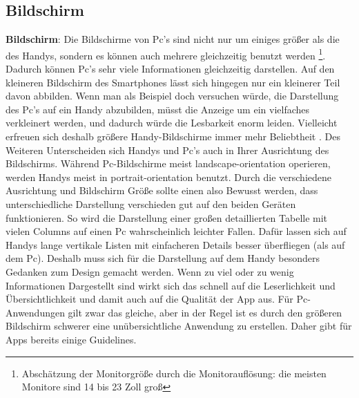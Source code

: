 \subsection{Bildschirm}

\myNewSection
\textbf{Bildschirm}: Die Bildschirme von Pc's sind nicht nur um einiges größer als die des Handys, sondern es können auch mehrere gleichzeitig benutzt werden \cite{pcVsphone_screenResolutionStats}\cite{pcVsphone_screenResolutionToSize}\footnote{Abschätzung der Monitorgröße durch die Monitorauflösung: die meisten Monitore sind 14 bis 23 Zoll groß}.\newline%
Dadurch können Pc's sehr viele Informationen gleichzeitig darstellen. Auf den kleineren Bildschirm des Smartphones lässt sich hingegen nur ein kleinerer Teil davon abbilden. Wenn man als Beispiel doch versuchen würde, die Darstellung des Pc's auf ein Handy abzubilden, müsst die Anzeige um ein vielfaches verkleinert werden, und dadurch würde die Lesbarkeit enorm leiden. Vielleicht erfreuen sich deshalb größere Handy-Bildschirme immer mehr Beliebtheit \cite{pcVsphone_screenSizePhone}.\newline%
Des Weiteren Unterscheiden sich Handys und Pc's auch in Ihrer Ausrichtung des Bildschirms. Während Pc-Bildschirme meist landscape-orientation operieren, werden Handys meist in portrait-orientation benutzt.\newline%
Durch die verschiedene Ausrichtung und Bildschirm Größe sollte einen also Bewusst werden, dass unterschiedliche Darstellung verschieden gut auf den beiden Geräten funktionieren.
So wird die Darstellung einer großen detaillierten Tabelle mit vielen Columns auf einen Pc wahrscheinlich leichter Fallen. Dafür lassen sich auf Handys lange vertikale Listen mit  einfacheren Details besser überfliegen (als auf dem Pc).\newline%
Deshalb muss sich für die Darstellung auf dem Handy besonders Gedanken zum Design gemacht werden. Wenn zu viel oder zu wenig Informationen Dargestellt sind wirkt sich das schnell auf die Leserlichkeit und Übersichtlichkeit und damit auch auf die Qualität der App aus. Für Pc-Anwendungen gilt zwar das gleiche, aber in der Regel ist es durch den größeren Bildschirm schwerer eine unübersichtliche Anwendung zu erstellen. Daher gibt für Apps bereits einige Guidelines\cite{konventionen_guidelinesApple}\cite{konventionen_guidelinesGoogle}.\newline%
